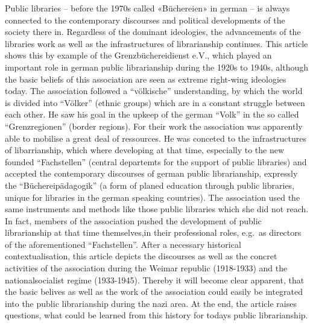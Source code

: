 Public libraries -- before the 1970s called «Büchereien» in german -- is
always connected to the contemporary discourses and political
developments of the society there in. Regardless of the dominant
ideologies, the advancements of the libraries work as well as the
infrastructures of librarianship continues. This article shows this by
example of the Grenzbüchereidienst e.V., which played an important role
in german public librarianship during the 1920s to 1940s, although the
basic beliefs of this association are seen as extreme right-wing
ideologies today. The association followed a ``völkische''
understanding, by which the world is divided into ``Völker'' (ethnic
groups) which are in a constant struggle between each other. He saw his
goal in the upkeep of the german ``Volk'' in the so called
``Grenzregionen'' (border regions). For their work the association was
apparently able to mobilise a great deal of ressources. He was conceted
to the infrastructures of libarrianship, which where developing at that
time, especially to the new founded ``Fachstellen'' (central departemts
for the support of public libraries) and accepted the contemporary
discourses of german public librarianship, expressly the
``Büchereipädagogik'' (a form of planed education through public
libraries, unique for libraries in the german speaking countries). The
association used the same instruments and methods like those public
libraries which she did not reach. In fact, members of the association
pushed the development of public librarianship at that time
themselves,in their professional roles, e.g.~as directors of the
aforementioned ``Fachstellen''. After a necessary historical
contextualisation, this article depicts the discourses as well as the
concret activities of the association during the Weimar republic
(1918-1933) and the nationalsocialist regime (1933-1945). Thereby it
will become clear apparent, that the basic belives as well as the work
of the association could easily be integrated into the public
librarianship during the nazi area. At the end, the article raises
questions, what could be learned from this history for todays public
librarianship.
